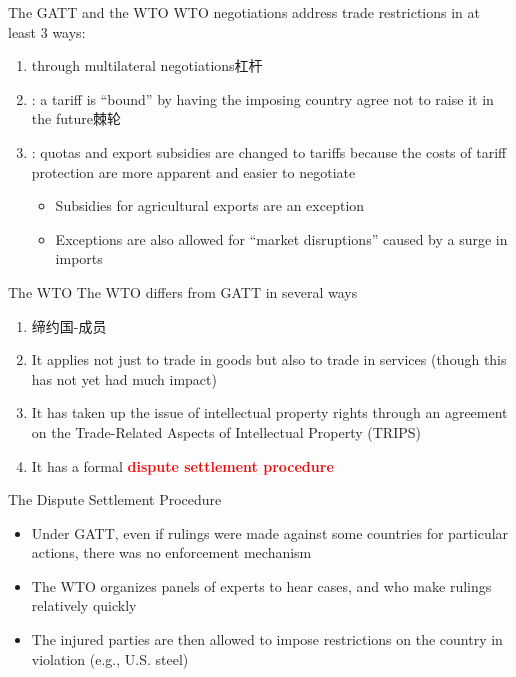 \documentclass[10pt,hyperref={CJKbookmarks=true},xcolor=dvipsnames,aspectratio=169]{beamer}
\begin{document}
\begin{frame}{The GATT and the WTO}
WTO negotiations address trade restrictions in at least 3 ways:	\begin{enumerate}
		\item {} through multilateral negotiations杠杆
		\item {}: a tariff is “bound” by having the
		imposing country agree not to raise it in the future棘轮
		\item {}: quotas and export subsidies		are changed to tariffs because the costs of tariff protection are		more apparent and easier to negotiate
		\begin{itemize}
			\item Subsidies for agricultural exports are an exception
			\item Exceptions are also allowed for “market disruptions” caused
			by a surge in imports
		\end{itemize}
		
	\end{enumerate}
\end{frame}

\begin{frame}{The WTO}
The WTO differs from GATT in several ways
	\begin{enumerate}
		\item 缔约国-成员
		\item It applies not just to trade in goods but also to trade in
		services (though this has not yet had much impact)
		\item It has taken up the issue of intellectual property rights
		through an agreement on the Trade-Related Aspects
		of Intellectual Property (TRIPS)
		\item It has a formal \textbf{\textcolor{red}{dispute settlement procedure}}
	\end{enumerate}

\end{frame}

\begin{frame}{The Dispute Settlement Procedure}
	\begin{itemize}
		\item Under GATT, even if rulings were made against
		some countries for particular actions, there was no
		enforcement mechanism
		\item The WTO organizes panels of experts to hear cases,
		and who make rulings relatively quickly
		\item The injured parties are then allowed to impose
		restrictions on the country in violation (e.g., U.S.
		steel)
	\end{itemize}
\end{frame}
\end{document}
